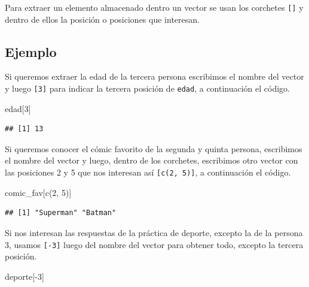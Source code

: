 \documentclass[
]{book}
\makeatletter
\newenvironment{Shaded}{\begin{snugshade}}{\end{snugshade}}
\newcommand{\DecValTok}[1]{\textcolor[rgb]{0.00,0.00,0.81}{#1}}
\newcommand{\FunctionTok}[1]{\textcolor[rgb]{0.00,0.00,0.00}{#1}}
\newcommand{\NormalTok}[1]{#1}
\newcommand{\SpecialCharTok}[1]{\textcolor[rgb]{0.00,0.00,0.00}{#1}}
\newenvironment{kframe}{%
\medskip{}
\setlength{\fboxsep}{.8em}
 \def\at@end@of@kframe{}%
 \ifinner\ifhmode%
  \def\at@end@of@kframe{\end{minipage}}%
  \begin{minipage}{\columnwidth}%
 \fi\fi%
 \def\FrameCommand##1{\hskip\@totalleftmargin \hskip-\fboxsep
 \colorbox{shadecolor}{##1}\hskip-\fboxsep
     \hskip-\linewidth \hskip-\@totalleftmargin \hskip\columnwidth}%
 \MakeFramed {\advance\hsize-\width
   \@totalleftmargin\z@ \linewidth\hsize
   \@setminipage}}%
 {\par\unskip\endMakeFramed%
 \at@end@of@kframe}
\renewenvironment{Shaded}{\begin{kframe}}{\end{kframe}}
\makeatother
\begin{document}
Para extraer un elemento almacenado dentro un vector se usan los corchetes \texttt{{[}{]}} y dentro de ellos la posición o posiciones que interesan.

\hypertarget{ejemplo}{%
\subsection*{Ejemplo}\label{ejemplo}}

Si queremos extraer la edad de la tercera persona escribimos el nombre del vector y luego \texttt{{[}3{]}} para indicar la tercera posición de \texttt{edad}, a continuación el código.

\begin{Shaded}
\begin{Highlighting}[]
\NormalTok{edad[}\DecValTok{3}\NormalTok{]}
\end{Highlighting}
\end{Shaded}

\begin{verbatim}
## [1] 13
\end{verbatim}

Si queremos conocer el cómic favorito de la segunda y quinta persona, escribimos el nombre del vector y luego, dentro de los corchetes, escribimos otro vector con las posiciones 2 y 5 que nos interesan así \texttt{{[}c(2,\ 5){]}}, a continuación el código.

\begin{Shaded}
\begin{Highlighting}[]
\NormalTok{comic\_fav[}\FunctionTok{c}\NormalTok{(}\DecValTok{2}\NormalTok{, }\DecValTok{5}\NormalTok{)]}
\end{Highlighting}
\end{Shaded}

\begin{verbatim}
## [1] "Superman" "Batman"
\end{verbatim}

Si nos interesan las respuestas de la práctica de deporte, excepto la de la persona 3, usamos \texttt{{[}-3{]}} luego del nombre del vector para obtener todo, excepto la tercera posición.

\begin{Shaded}
\begin{Highlighting}[]
\NormalTok{deporte[}\SpecialCharTok{{-}}\DecValTok{3}\NormalTok{]}
\end{Highlighting}
\end{Shaded}
\end{document}
